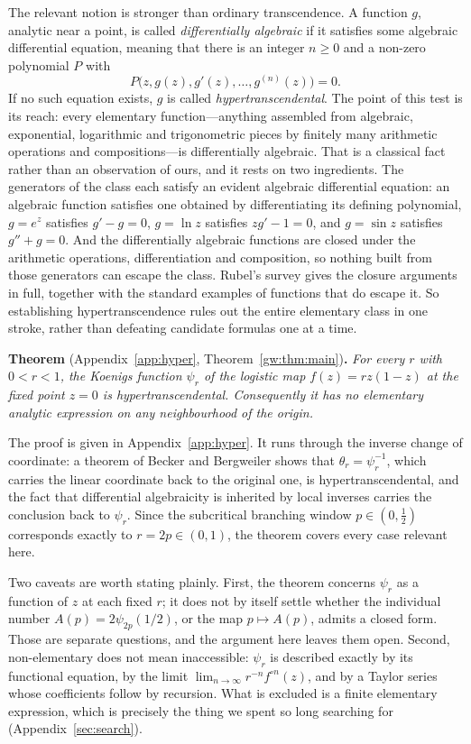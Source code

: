 The relevant notion is stronger than ordinary transcendence. A function $g$, analytic near a point, is called \emph{differentially algebraic} if it satisfies some algebraic differential equation, meaning that there is an integer $n\geq0$ and a non-zero polynomial $P$ with
\[
P\bigl(z,g(z),g'(z),\ldots,g^{(n)}(z)\bigr)=0 .
\]
If no such equation exists, $g$ is called \emph{hypertranscendental}. The point of this test is its reach: every elementary function---anything assembled from algebraic, exponential, logarithmic and trigonometric pieces by finitely many arithmetic operations and compositions---is differentially algebraic. That is a classical fact rather than an observation of ours, and it rests on two ingredients. The generators of the class each satisfy an evident algebraic differential equation: an algebraic function satisfies one obtained by differentiating its defining polynomial, $g=e^z$ satisfies $g'-g=0$, $g=\ln z$ satisfies $zg'-1=0$, and $g=\sin z$ satisfies $g''+g=0$. And the differentially algebraic functions are closed under the arithmetic operations, differentiation and composition, so nothing built from those generators can escape the class. Rubel's survey \cite{Rubel1989} gives the closure arguments in full, together with the standard examples of functions that do escape it. So establishing hypertranscendence rules out the entire elementary class in one stroke, rather than defeating candidate formulas one at a time.


\medskip
\noindent\textbf{Theorem} (Appendix~\ref{app:hyper}, Theorem~\ref{gw:thm:main})\textbf{.}
\emph{For every $r$ with $0<r<1$, the Koenigs function $\psi_r$ of the logistic map $f(z)=rz(1-z)$ at the fixed point $z=0$ is hypertranscendental. Consequently it has no elementary analytic expression on any neighbourhood of the origin.}
\medskip

\noindent
The proof is given in Appendix~\ref{app:hyper}. It runs through the inverse change of coordinate: a theorem of Becker and Bergweiler \cite{BeckerBergweiler1995} shows that $\theta_r=\psi_r^{-1}$, which carries the linear coordinate back to the original one, is hypertranscendental, and the fact that differential algebraicity is inherited by local inverses carries the conclusion back to $\psi_r$. Since the subcritical branching window $p\in(0,\tfrac12)$ corresponds exactly to $r=2p\in(0,1)$, the theorem covers every case relevant here.

Two caveats are worth stating plainly. First, the theorem concerns $\psi_r$ as a function of $z$ at each fixed $r$; it does not by itself settle whether the individual number $A(p)=2\psi_{2p}(1/2)$, or the map $p\mapsto A(p)$, admits a closed form. Those are separate questions, and the argument here leaves them open. Second, non-elementary does not mean inaccessible: $\psi_r$ is described exactly by its functional equation, by the limit $\lim_{n\to\infty}r^{-n}f^{\circ n}(z)$, and by a Taylor series whose coefficients follow by recursion. What is excluded is a finite elementary expression, which is precisely the thing we spent so long searching for (Appendix~\ref{sec:search}).

